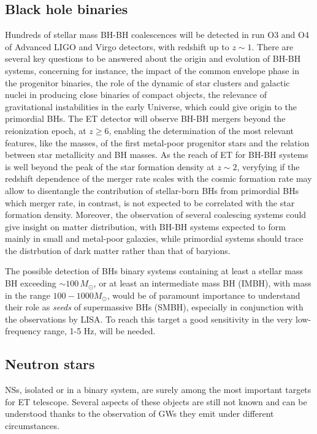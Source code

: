 \subsection{Black hole binaries}
Hundreds of stellar mass BH-BH coalescences will be detected in run O3 and O4 of Advanced LIGO and Virgo detectors, with redshift up to $z\sim 1$. There are several key questions to be answered about the origin and evolution of BH-BH systems, concerning for instance, the impact of the common envelope phase in the progenitor binaries, the role of the dynamic of star clusters and galactic nuclei in producing close binaries of compact objects, the relevance of gravitational instabilities in the early Universe, which could give origin to the primordial BHs. The ET detector will observe BH-BH mergers beyond the reionization epoch, at $z \ge 6$, enabling the determination of the most relevant features, like the masses, of the first metal-poor progenitor stars and the relation between star metallicity and BH masses. As the reach of ET for BH-BH systems is well beyond the peak of the star formation density at $z\sim 2$, veryfying if the redshift dependence of the merger rate scales with the cosmic formation rate may allow to disentangle the contribution of stellar-born BHs from primordial BHs which merger rate, in contrast, is not expected to be correlated with the star formation density. Moreover, the observation of several coalescing systems could give insight on matter distribution, with BH-BH systems expected to form mainly in small and metal-poor galaxies, while primordial systems should trace the distrbution of dark matter rather than that of baryions.

The possible detection of BHs binary systems containing at least a stellar mass BH exceeding $\sim 100\,M_\odot$, or at least an intermediate mass BH (IMBH), with mass in the range $100-1000M_{\odot}$, would be of paramount importance to understand their role as {\it seeds} of supermassive BHs (SMBH), especially in conjunction with the observations by LISA. To reach this target a good sensitivity in the very low-frequency range, 1-5 Hz, will be needed.       

\subsection{Neutron stars}
NSs, isolated or in a binary system, are surely among the most important targets for ET telescope. Several aspects of these objects are still not known and can be understood thanks to the observation of GWs they emit under different circumstances. 

